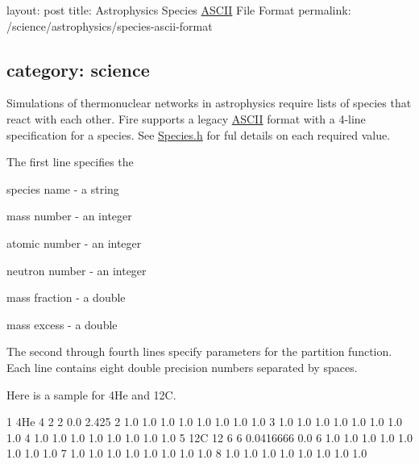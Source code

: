 

 layout\+: post title\+: Astrophysics Species \hyperlink{a00038}{A\+S\+C\+II} File Format permalink\+: /science/astrophysics/species-\/ascii-\/format \subsection*{category\+: science }

Simulations of thermonuclear networks in astrophysics require lists of species that react with each other. Fire supports a legacy \hyperlink{a00038}{A\+S\+C\+II} format with a 4-\/line specification for a species. See \hyperlink{a00740_source}{Species.\+h} for ful details on each required value.

The first line specifies the


\begin{DoxyItemize}
\item species name -\/ a string
\item mass number -\/ an integer
\item atomic number -\/ an integer
\item neutron number -\/ an integer
\item mass fraction -\/ a double
\item mass excess -\/ a double
\end{DoxyItemize}

The second through fourth lines specify parameters for the partition function. Each line contains eight double precision numbers separated by spaces.

Here is a sample for 4\+He and 12C.


\begin{DoxyCode}
1 4He 4 2 2 0.0 2.425
2 1.0 1.0 1.0 1.0 1.0 1.0 1.0 1.0
3 1.0 1.0 1.0 1.0 1.0 1.0 1.0 1.0
4 1.0 1.0 1.0 1.0 1.0 1.0 1.0 1.0
5 12C 12 6 6 0.0416666 0.0
6 1.0 1.0 1.0 1.0 1.0 1.0 1.0 1.0
7 1.0 1.0 1.0 1.0 1.0 1.0 1.0 1.0
8 1.0 1.0 1.0 1.0 1.0 1.0 1.0 1.0
\end{DoxyCode}
 